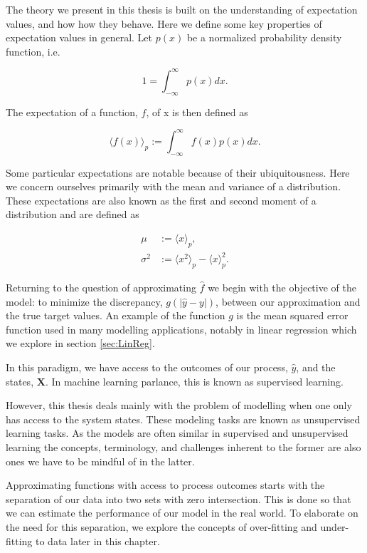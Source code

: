 The theory we present in this thesis is built on the understanding of expectation values, and how how they behave.  Here we define some key properties of expectation values in general. Let $p(x)$ be a normalized probability density function, i.e.

\begin{equation}
1 = \int_{-\infty}^\infty p(x) dx.
\end{equation}

\noindent The expectation of a function, $f$, of x is then defined as 

\begin{equation}\label{eq:expect}
\langle f(x) \rangle_p :=\int_{-\infty}^\infty f(x) p(x) dx.
\end{equation}

\noindent Some particular expectations are notable because of their ubiquitousness. Here we concern ourselves primarily with the mean and variance of a distribution. These expectations are also known as the first and second moment of a distribution and are defined as

\begin{align}
\mu &:= \langle x \rangle_p, \\
\sigma^2 &:= \langle x^2 \rangle_p  - \langle x\rangle_p^2.
\end{align}

\noindent Returning to the question of approximating $\hat{f}$ we begin with the objective of the model: to minimize the discrepancy, $g(|\hat{y} - y|)$, between our approximation and the true target values. An example of the function $g$ is the mean squared error function used in many modelling applications, notably in linear regression which we explore in section \ref{sec:LinReg}.

In this paradigm, we have access to the outcomes of our process, $\hat{y}$, and the states, $\mathbf{X}$. In machine learning parlance, this is known as supervised learning. 

However, this thesis deals mainly with the problem of modelling when one only has access to the system states. These modeling tasks are known as unsupervised learning tasks. As the models are often similar in supervised and unsupervised learning the concepts, terminology, and challenges inherent to the former are also ones we have to be mindful of in the latter.

Approximating functions with access to process outcomes starts with the separation of our data into two sets with zero intersection. This is done so that we can estimate the performance of our model in the real world. To elaborate on the need for this separation, we explore the concepts of over-fitting and under-fitting to data later in this chapter.
